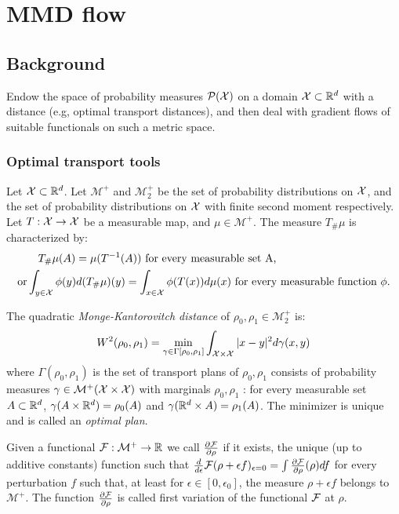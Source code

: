 \section{MMD flow}


\subsection{Background}

Endow the space of probability measures $\mathcal{P}({{\mathcal X}})$ on a domain ${{\mathcal X}} \subset {{\mathbb R}}^d$ with a distance (e.g, optimal transport distances), and then deal with gradient flows of suitable functionals on such a metric space.



\subsubsection{Optimal transport tools}

Let ${{\mathcal X}} \subset {{\mathbb R}}^d$. Let $\mathcal{M}^{+}$ and $\mathcal{M}_2^{+}$ be the set of probability distributions on ${{\mathcal X}}$, and the set of probability distributions on ${{\mathcal X}}$ with finite second moment respectively.
Let $T: {{\mathcal X}} \rightarrow {{\mathcal X}}$ be a measurable map, and $\mu \in \mathcal{M}^+$. The measure $T_{\#}\mu$
is characterized by:
\begin{align*}
	&\quad T_{\#}\mu(A) = \mu(T^{-1}(A)) \text{ for every measurable set A,}\\
\text{or}& \int_{y \in {{\mathcal X}}} \phi(y) d(T_{\#}\mu)(y) =\int_{x \in {{\mathcal X}}}\phi(T(x)) d\mu(x) \text{ for every measurable function $\phi$.}
\end{align*}


\begin{definition}\label{def:mk}
	The quadratic \textit{Monge-Kantorovitch distance} of $\rho_0, \rho_1 \in \mathcal{M}_2^{+}$ is:
	\begin{equation}
		W^2(\rho_0, \rho_1)= \min_{\gamma \in \Gamma[\rho_0, \rho_1]} \int_{{{\mathcal X}} \times {{\mathcal X}}} |x-y|^2 d\gamma(x,y)
	\end{equation}
where $\Gamma(\rho_0,\rho_1)$ is the set of transport plans of $\rho_0, \rho_1$ consists of probability measures $\gamma \in \mathcal{M}^{+}({{\mathcal X}} \times {{\mathcal X}})$ with marginals $\rho_0, \rho_1$ : for every measurable set $A \subset {{\mathbb R}}^d$, $\gamma(A \times {{\mathbb R}}^d) = \rho_0(A)$ and $\gamma({{\mathbb R}}^d \times A) = \rho_1(A)$. 
	The minimizer is unique and is called an \textit{optimal plan}. 
\end{definition}


Given a functional ${{\mathcal F}} : \mathcal{M}^+ \rightarrow {{\mathbb R}}$ we call $\frac{\partial{{{\mathcal F}}}}{\partial{\rho}}$ if it exists, the unique (up to additive constants) function such that $\frac{d}{d\epsilon}{{\mathcal F}}(\rho+\epsilon  f)_{\epsilon=0}=\int\frac{\partial{{{\mathcal F}}}}{\partial{\rho}}(\rho) df$ for every perturbation $f$ such that, at least for $\epsilon \in [0, \epsilon_0]$, the measure $\rho +\epsilon f$ belongs to $\mathcal{M}^+$. The function $\frac{\partial{{{\mathcal F}}}}{\partial{\rho}}$ is called first variation of the functional ${{\mathcal F}}$ at $\rho$.

